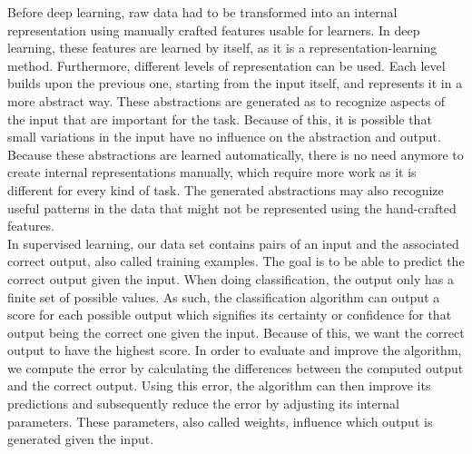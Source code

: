 \documentclass[a4paper]{article}
\begin{document}
Before deep learning, raw data had to be transformed into an internal representation using manually crafted features usable for learners. In deep learning, these features are learned by itself, as it is a representation-learning method. Furthermore, different levels of representation can be used. Each level builds upon the previous one, starting from the input itself, and represents it in a more abstract way. These abstractions are generated as to recognize aspects of the input that are important for the task. Because of this, it is possible that small variations in the input have no influence on the abstraction and output. Because these abstractions are learned automatically, there is no need anymore to create internal representations manually, which require more work as it is different for every kind of task. The generated abstractions may also recognize useful patterns in the data that might not be represented using the hand-crafted features.\\


In supervised learning, our data set contains pairs of an input and the associated correct output, also called training examples. The goal is to be able to predict the correct output given the input. When doing classification, the output only has a finite set of possible values. As such, the classification algorithm can output a score for each possible output which signifies its certainty or confidence for that output being the correct one given the input. Because of this, we want the correct output to have the highest score. In order to evaluate and improve the algorithm, we compute the error by calculating the differences between the computed output and the correct output. Using this error, the algorithm can then improve its predictions and subsequently reduce the error by adjusting its internal parameters. These parameters, also called weights, influence which output is generated given the input.\\
\end{document}

